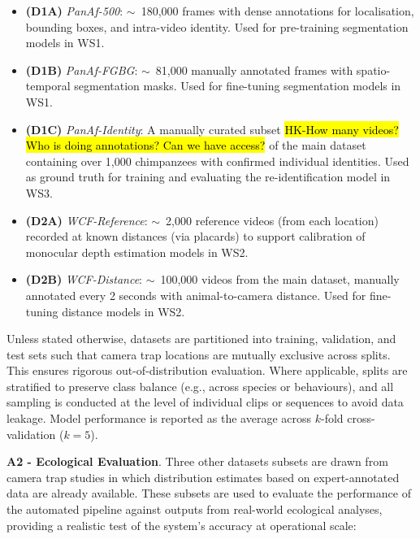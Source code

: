 \begin{itemize}
      \item \textbf{(D1A)} \textit{PanAf-500}: $\sim$~180,000 frames with dense annotations for localisation, bounding boxes, and intra-video identity. Used for pre-training segmentation models in WS1.

      \item \textbf{(D1B)} \textit{PanAf-FGBG}: $\sim$~81,000 manually annotated frames with spatio-temporal segmentation masks. Used for fine-tuning segmentation models in WS1.

      \item \textbf{(D1C)} \textit{PanAf-Identity}: A manually curated subset \hl{HK-How many videos? Who is doing annotations? Can we have access?} of the main dataset containing over 1,000 chimpanzees with confirmed individual identities. Used as ground truth for training and evaluating the re-identification model in WS3.

      \item \textbf{(D2A)} \textit{WCF-Reference}: $\sim$~2,000 reference videos (from each location) recorded at known distances (via placards) to support calibration of monocular depth estimation models in WS2.

      \item \textbf{(D2B)} \textit{WCF-Distance}: $\sim$~100,000 videos from the main dataset, manually annotated every 2 seconds with animal-to-camera distance. Used for fine-tuning distance models in WS2.
\end{itemize}

Unless stated otherwise, datasets are partitioned into training, validation, and test sets such that camera trap locations are mutually exclusive across splits. This ensures rigorous out-of-distribution evaluation. Where applicable, splits are stratified to preserve class balance (e.g., across species or behaviours), and all sampling is conducted at the level of individual clips or sequences to avoid data leakage. Model performance is reported as the average across $k$-fold cross-validation ($k=5$).



\textbf{A2 - Ecological Evaluation}. Three other datasets subsets are drawn from camera trap studies in which distribution estimates based on expert-annotated data are already available. These subsets are used to evaluate the performance of the automated pipeline against outputs from real-world ecological analyses, providing a realistic test of the system’s accuracy at operational scale:

